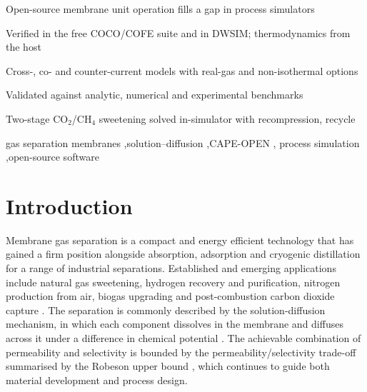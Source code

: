 \documentclass[a4paper,fleqn]{cas-dc}
\begin{document}
\begin{highlights}
\item Open-source membrane unit operation fills a gap in process simulators
\item Verified in the free COCO/COFE suite and in DWSIM; thermodynamics from the host
\item Cross-, co- and counter-current models with real-gas and non-isothermal options
\item Validated against analytic, numerical and experimental benchmarks
\item Two-stage CO$_2$/CH$_4$ sweetening solved in-simulator with recompression, recycle
\end{highlights}

\begin{keywords}
gas separation membranes \sep solution--diffusion \sep CAPE-OPEN \sep
process simulation \sep open-source software
\end{keywords}

\maketitle

\section{Introduction}\label{sec:intro}
Membrane gas separation is a compact and energy efficient technology that has
gained a firm position alongside absorption, adsorption and cryogenic
distillation for a range of industrial separations. Established and emerging
applications include natural gas sweetening, hydrogen recovery and
purification, nitrogen production from air, biogas upgrading and
post-combustion carbon dioxide capture
\citep{Bernardo2009,BakerLokhandwala2008,Merkel2010}. The separation is
commonly described by the solution-diffusion mechanism, in which each component
dissolves in the membrane and diffuses across it under a difference in chemical
potential \citep{wijmans1995,baker2004}. The achievable combination of
permeability and selectivity is bounded by the permeability/selectivity
trade-off summarised by the Robeson upper bound \citep{Robeson2008}, which
continues to guide both material development and process design.
\end{document}
